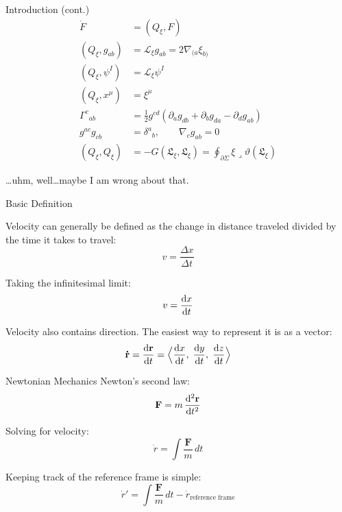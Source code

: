 \documentclass[aspectratio=169,11pt]{beamer}
\begin{document}
\begin{frame}[fragile]{Introduction (cont.)}
{\footnotesize
\begin{align*}
\dot{F} &= (Q_{\xi},F) \\[0.6ex]
(Q_{\xi},g_{ab}) &= \mathcal{L}_{\xi}g_{ab} = 2\nabla_{(a}\xi_{b)} \\
(Q_{\xi},\psi^{I}) &= \mathcal{L}_{\xi}\psi^{I} \\
(Q_{\xi},x^{\mu}) &= \xi^{\mu} \\[0.8ex]
\Gamma^{c}{}_{ab} &= \tfrac12 g^{cd}(\partial_{a}g_{db}+\partial_{b}g_{da}-\partial_{d}g_{ab}) \\
g^{ac}g_{cb}&=\delta^{a}{}_{b},\qquad\nabla_{c}g_{ab}=0 \\[0.8ex]
(Q_{\xi},Q_{\xi}) &= -G(\mathfrak{L}_{\xi},\mathfrak{L}_{\xi})
  = \oint_{\partial\Sigma}\xi\mathbin{\lrcorner}\vartheta(\mathfrak{L}_{\xi})
\end{align*}
}

\vspace{0.8em}
\centering\large \ldots uhm, well\ldots maybe I am wrong about that.
\end{frame}

\begin{frame}{Basic Definition}


Velocity can generally be defined as the change in distance traveled divided by the time it takes to travel:
\[
v = \frac{\Delta x}{\Delta t}
\]

Taking the infinitesimal limit:
\[
v = \dv{x}{t}
\]

Velocity also contains direction. The easiest way to represent it is as a vector:
\[
\mathbf{\dot{r}} = \dv{\mathbf{r}}{t}
= \Bigl\langle \dv{x}{t},\;\dv{y}{t},\;\dv{z}{t}\Bigr\rangle
\]
\end{frame}

\begin{frame}{Newtonian Mechanics}
Newton's second law:
\[
\mathbf{F} = m\,\dv[2]{\mathbf{r}}{t}
\]

Solving for velocity:
\[
\dot{r} = \int\frac{\mathbf{F}}{m}\,dt
\]

Keeping track of the reference frame is simple:
\[
\dot{r}' = \int\frac{\mathbf{F}}{m}\,dt - \dot{r}_{\text{reference frame}}
\]
\end{frame}
\end{document}
